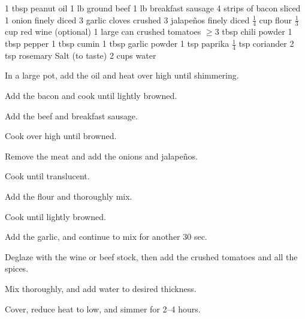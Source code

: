 \dishtype{}
\begin{ingreds}
    1 tbsp peanut oil
    1 lb ground beef
    1 lb breakfast sausage
    4 strips of bacon sliced 
    1 onion finely diced
    3 garlic cloves crushed
    3 jalape\~nos finely diced
    $\frac{1}{4}$ cup flour
    $\frac{1}{3}$ cup red wine (optional)
    1 large can crushed tomatoes
    $\geq$3 tbsp chili powder
    1 tbsp pepper
    1 tbsp cumin
    1 tbsp garlic powder
    1 tsp paprika
    $\frac{1}{4}$ tsp coriander
    2 tsp rosemary
    Salt (to taste)
    2 cups water
\end{ingreds}
\begin{method}
    In a large pot, add the oil and heat over high until shimmering.\par
    Add the bacon and cook until lightly browned.\par
    Add the beef and breakfast sausage.\par
    Cook over high until browned.\par
    Remove the meat and add the onions and jalape\~nos.\par
    Cook until translucent.\par
    Add the flour and thoroughly mix.\par
    Cook until lightly browned.\par
    Add the garlic, and continue to mix for another 30 sec.\par
    Deglaze with the wine or beef stock, then add the crushed tomatoes and all the spices.\par
    Mix thoroughly, and add water to desired thickness.\par
    Cover, reduce heat to low, and simmer for 2--4 hours. 
\end{method}